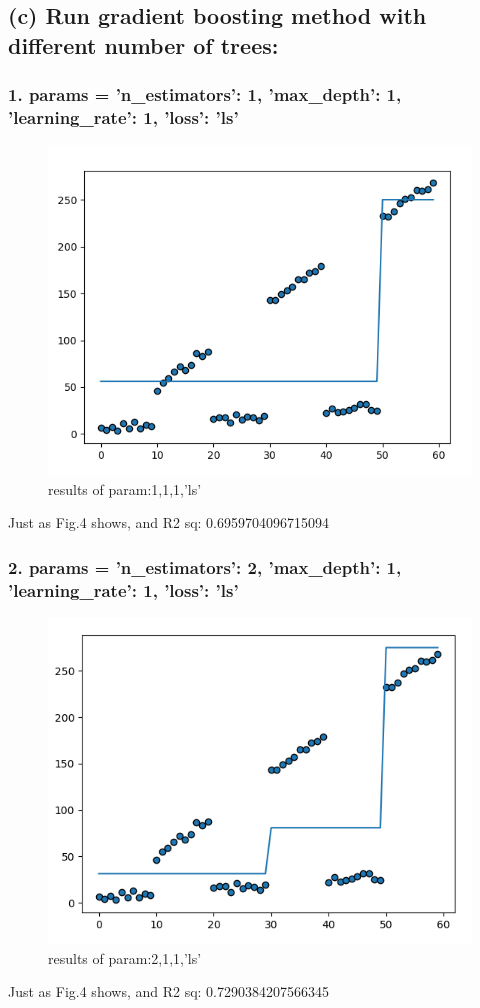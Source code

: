 \documentclass[a4paper,12pt]{journal}
\begin{document}
	\subsection*{(c) Run gradient boosting method with different number of trees:}
	\subsubsection*{1. params = {'n\_estimators': 1, 'max\_depth': 1, 'learning\_rate': 1, 'loss': 'ls'}}
	\begin{figure}[htbp]
		\centering
		\includegraphics[scale=0.8]{1_c_1.png}
		\caption{results of param:1,1,1,'ls'}
	\end{figure}
	Just as Fig.4 shows, and R2 sq:  0.6959704096715094
	\subsubsection*{2. params = {'n\_estimators': 2, 'max\_depth': 1, 'learning\_rate': 1, 'loss': 'ls'}}
	\begin{figure}[htbp]
		\centering
		\includegraphics[scale=0.8]{1_c_2.png}
		\caption{results of param:2,1,1,'ls'}
	\end{figure}
	Just as Fig.4 shows, and R2 sq:  0.7290384207566345
\end{document}
